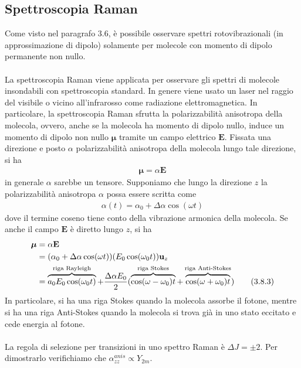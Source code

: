 \documentclass{article}
\begin{document}
\subsection{Spettroscopia Raman}
Come visto nel paragrafo $3.6$, è possibile osservare spettri rotovibrazionali (in approssimazione di dipolo) solamente per molecole con momento di dipolo permanente non nullo. \\ \\
La spettroscopia Raman viene applicata per osservare gli spettri di molecole insondabili con spettroscopia standard. In genere viene usato un laser nel raggio del visibile o vicino all'infrarosso come radiazione elettromagnetica. In particolare, la spettroscopia Raman sfrutta la polarizzabilità anisotropa della molecola, ovvero, anche se la molecola ha momento di dipolo nullo, induce un momento di dipolo non nullo $\boldsymbol{\mu}$ tramite un campo elettrico $\mathbf{E}$. Fissata una direzione e posto $\alpha$ polarizzabilità anisotropa della molecola lungo tale direzione, si ha
\begin{align}
    \boldsymbol{\mu} = \alpha\mathbf{E} \tag{3.8.1}
\end{align}
in generale $\alpha$ sarebbe un tensore. Supponiamo che lungo la direzione $z$ la polarizzabilità anisotropa $\alpha$ possa essere scritta come
\begin{align}
    \alpha(t) = \alpha_0 + \Delta\alpha\cos(\omega t) \tag{3.8.2}
\end{align}
dove il termine coseno tiene conto della vibrazione armonica della molecola. Se anche il campo $\mathbf{E}$ è diretto lungo $z$, si ha
\begin{align}
    \boldsymbol{\mu} &= \alpha\mathbf{E} \notag \\
    &= (\alpha_0 + \Delta\alpha\cos(\omega t))(E_0\cos(\omega_0 t))\mathbf{u}_z \notag \\
    &= \overbrace{a_0E_0\cos(\omega_0 t)}^{\text{riga Rayleigh}} + \frac{\Delta\alpha E_0}{2}(\overbrace{\cos(\omega - \omega_0)t}^{\text{riga Stokes}} + \overbrace{\cos(\omega + \omega_0)t}^{\text{riga Anti-Stokes}}) \tag{3.8.3}
\end{align}
In particolare, si ha una riga Stokes quando la molecola assorbe il fotone, mentre si ha una riga Anti-Stokes quando la molecola si trova già in uno stato eccitato e cede energia al fotone. \\ \\
La regola di selezione per transizioni in uno spettro Raman è $\Delta J = \pm 2$. Per dimostrarlo verifichiamo che $\alpha^{anis}_{zz} \propto Y_{2m}$. \\
\end{document}
